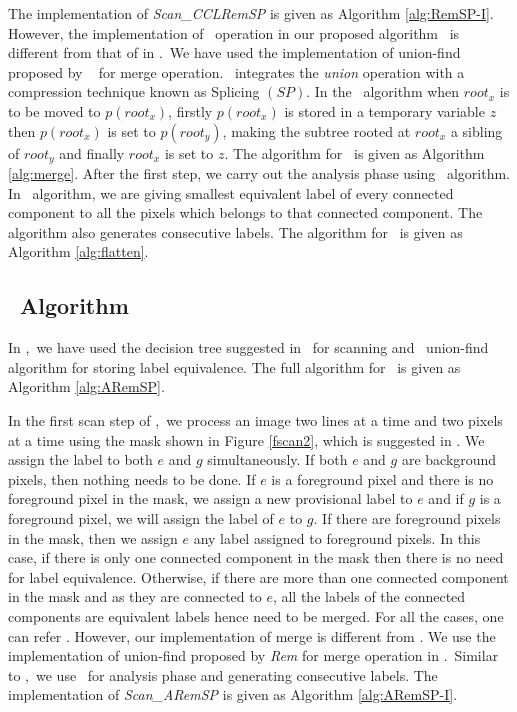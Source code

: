 
% 
The implementation of {\em Scan\_CCLRemSP} is given as Algorithm
\ref{alg:RemSP-I}. However, the implementation of \merge\ operation in our
proposed algorithm \remsp\ is different from that of in \lrpc.\
We have used the implementation of union-find proposed by \rems\ 
\cite{Patwary2010_RemSP, Dijkstra1976_RemSP} for merge operation. \rems\ integrates the {\em union}
operation with a compression technique known as Splicing $(SP)$. In the \merge\
algorithm when $root_x$ is to be moved to $p(root_x)$, firstly $p(root_x)$ is
stored in a temporary variable $z$ then $p(root_x)$ is set to $p(root_y)$,
making the subtree rooted at $root_x$ a sibling of $root_y$ and finally
$root_x$ is set to $z$. The algorithm for \merge\ is given as Algorithm
\ref{alg:merge}. After the first step, we carry out the analysis phase using \flatten\ algorithm. In \flatten\ algorithm, we are
giving smallest equivalent label of every connected component to all the pixels
which belongs to that connected component. The algorithm also
generates consecutive labels. The algorithm for \flatten\ is given as Algorithm
\ref{alg:flatten}. 



%
\subsection{\aremsp\ Algorithm}

In \aremsp,\ we have used the decision tree suggested in \arun\ 
for scanning and \rems\ union-find algorithm for storing label equivalence. The
full algorithm for \aremsp\ is given as Algorithm \ref{alg:ARemSP}.


% 

In the first scan step of \aremsp,\ we process an image two lines at a time and
two pixels at a time using the mask shown in Figure \ref{fscan2}, which is
suggested in \cite{He2012_ARun}.
We assign the label to both $e$ and $g$ simultaneously. If both $e$ and $g$ are
background pixels, then nothing needs to be done. If $e$ is a foreground pixel and there is no foreground pixel in the mask, we assign a 
new provisional label to $e$ and if $g$ is a foreground pixel, we will assign
the label of $e$ to $g$. If there are foreground pixels in the mask, then we assign $e$ any label assigned to 
foreground pixels. In this case, if there is only one connected component in the mask then there is 
no need for label equivalence. Otherwise, if there are more than one connected component in the mask and as 
they are connected to $e$, all the labels of the connected components are
equivalent labels hence need to be merged. For all the cases, one can refer
\cite{He2012_ARun}.
However, our implementation of merge is different from \cite{He2012_ARun}.
We use the implementation of union-find proposed by {\em Rem} \cite{Patwary2010_RemSP, Dijkstra1976_RemSP} for merge operation in
\aremsp.\ Similar to \nremsp,\ we use \flatten\ for analysis phase
and generating consecutive labels. The implementation of {\em Scan\_ARemSP} is given as Algorithm
\ref{alg:ARemSP-I}.

%
% 





 
